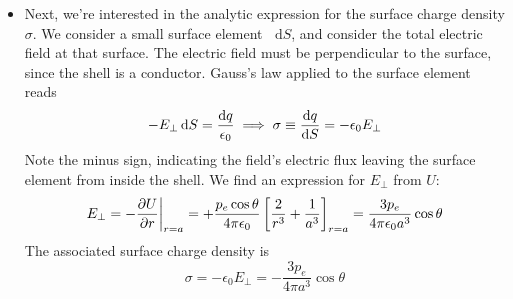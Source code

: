 \documentclass[11pt, a4paper]{article}
\newcommand{\diff}{\mathop{}\!\mathrm{d}} %
\newcommand{\e}{\epsilon_{0}}  %
\begin{document}
\begin{itemize}
	\item Next, we're interested in the analytic expression for the surface charge density $ \sigma $. We consider a small surface element $ \diff S $, and consider the total electric field at that surface. The electric field must be perpendicular to the surface, since the shell is a conductor. Gauss's law applied to the surface element reads
	\begin{equation*}
		- E_{\perp} \diff S = \frac{\diff q}{\e} \implies \sigma \equiv \dv{q}{S} = -\e E_{\perp}
	\end{equation*}
	Note the minus sign, indicating the field's electric flux leaving the surface element from inside the shell. We find an expression for $ E_{\perp} $ from $ U $:
	\begin{equation*}
		E_{\perp} = -\pdv{U}{r}\bigg|_{r = a} = + \frac{p_{e}\cos \theta}{4\pi \e}\left[\frac{2}{r^{3}} + \frac{1}{a^{3}}\right]_{r = a} = \frac{3p_{e}}{4\pi \e a^{3}} \cos \theta
	\end{equation*}
	The associated surface charge density is
	\begin{equation*}
		\sigma = -\e E_{\perp} = -\frac{3p_{e}}{4\pi a^{3}} \cos \theta
	\end{equation*}
	
	
\end{itemize}
\end{document}
